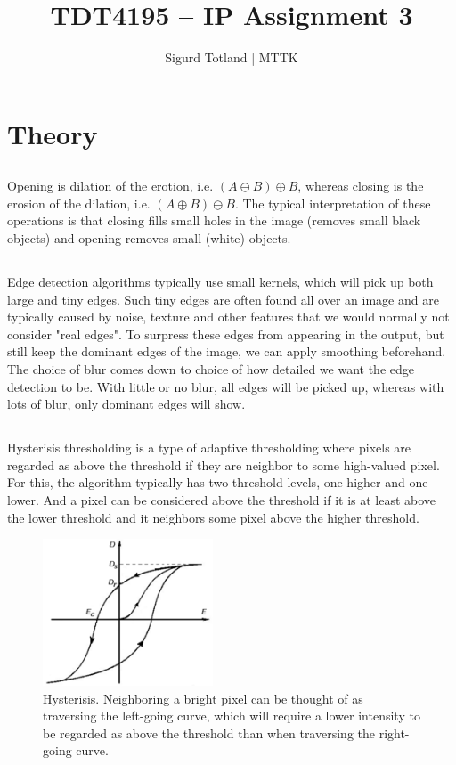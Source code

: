 \documentclass[]{article}
\title{TDT4195 – IP Assignment 3}
\author{Sigurd Totland | MTTK}
\begin{document}
\maketitle

\section{Theory}
\subsection{}
Opening is dilation of the erotion, i.e. $(A \ominus B) \oplus B$, whereas closing is the erosion of the dilation, i.e. $(A \oplus B) \ominus B$. The typical interpretation of these operations is that closing fills small holes in the image (removes small black objects) and opening removes small (white) objects.

\subsection{}
Edge detection algorithms typically use small kernels, which will pick up both large and tiny edges. Such tiny edges are often found all over an image and are typically caused by noise, texture and other features that we would normally not consider "real edges". To surpress these edges from appearing in the output, but still keep the dominant edges of the image, we can apply smoothing beforehand. The choice of blur comes down to choice of how detailed we want the edge detection to be. With little or no blur, all edges will be picked up, whereas with lots of blur, only dominant edges will show.

\subsection{}
Hysterisis thresholding is a type of adaptive thresholding where pixels are regarded as above the threshold if they are neighbor to some high-valued pixel. For this, the algorithm typically has two threshold levels, one higher and one lower. And a pixel can be considered above the threshold if it is at least above the lower threshold and it neighbors some pixel above the higher threshold.
\begin{figure}[H]
\centering
\includegraphics[width=0.45\textwidth]{img/hysterisis}
\caption{Hysterisis. Neighboring a bright pixel can be thought of as traversing the left-going curve, which will require a lower intensity to be regarded as above the threshold than when traversing the right-going curve.}
\label{fig:hysterisis}
\end{figure}
\end{document}
